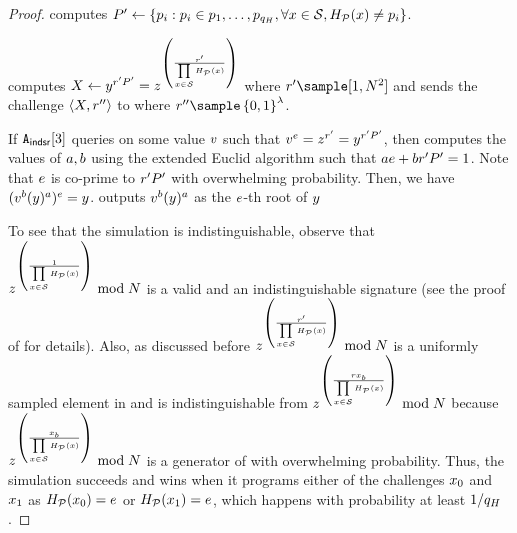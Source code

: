 \begin{proof}
	\item \rsaAdversary computes $\randPrimeAccSet' \gets \{ \randPrimes[i]:\randPrimes[i] \in \randPrimes[1], \dots, \randPrimes[\oracleQueries],  \forall \genericSetElmt \in \genericSetVar, \primeRO(\genericSetElmt)   \neq \randPrimes[i] \}$. 

\item \rsaAdversary computes $\dhVar[1] \gets \genericFnOutput^{\genericRandAlt P'} = 
	\simFnOutput^{ \left(\frac{\genericRandAlt}{\challengeSetAcc}\right)}$ where 
	$\genericRandAlt \sample [1, \rsaMod^2]$ and sends the challenge 
	$\tupleDefn{\dhVar[1], \genericRandAltAlt}$ to  where $\genericRandAltAlt \sample 
		\setDefn{0,1}^{\secParam}$. 
	
	
	\item If $\indsrAdversary{3}$ queries \ro on some value $v$ such that 
	$\genericVal^{\rsaExponent} = \simFnOutput^{\genericRandAlt} = 
	\genericFnOutput^{\genericRandAlt 
	\randPrimeAccSet'}$, then \rsaAdversary computes the values of $\euclideanConst[1], 
	\euclideanConst[2]$ using the 
	extended Euclid algorithm such that 
	$\euclideanConst[1] \rsaExponent + \euclideanConst[2] \genericRandAlt \randPrimeAccSet' = 1$. 
	Note that $e$ is co-prime to $\genericRandAlt \randPrimeAccSet'$ with overwhelming 
	probability. Then, we have 
	$(\genericVal^{\euclideanConst[2]} (\genericFnOutput)^{\euclideanConst[1]})^{\rsaExponent} 
	= \genericFnOutput$. \rsaAdversary outputs $\genericVal^{\euclideanConst[2]} 
	(\genericFnOutput)^{\euclideanConst[1]}$ as the $e$-th root of $\genericFnOutput$ 
	
\enumListEnd


To see that the simulation is indistinguishable, observe that 
$\simFnOutput^{\left(\frac{1}{\challengeSetAcc}\right)} \bmod \rsaMod$ is a valid and an 
indistinguishable signature 
(see the proof of  for details). Also, as discussed before $ 	
\simFnOutput^{\left(\frac{\genericRandAlt}{\challengeSetAcc}\right)} \bmod \rsaMod$ is a uniformly 
sampled element 
in \qrGroup 
and is indistinguishable from $\simFnOutput^{\left(\frac{\genericRand 
\genericSetElmt[\indBit]}{\challengeSetAcc}\right)} \bmod \rsaMod$ because 
$\simFnOutput^{\left(\frac{
\genericSetElmt[\indBit]}{\challengeSetAcc}\right)} \bmod \rsaMod$ is a generator of \qrGroup with 
overwhelming probability. Thus, the simulation succeeds and \rsaAdversary wins when it programs 
either of the challenges $\genericSetElmt[0]$ and $\genericSetElmt[1]$ as  
$\primeRO(\genericSetElmt[0]) = \rsaExponent$ or 
$\primeRO(\genericSetElmt[1]) = \rsaExponent$, which happens with probability at least 
$1/q_H$. 


\end{proof}

